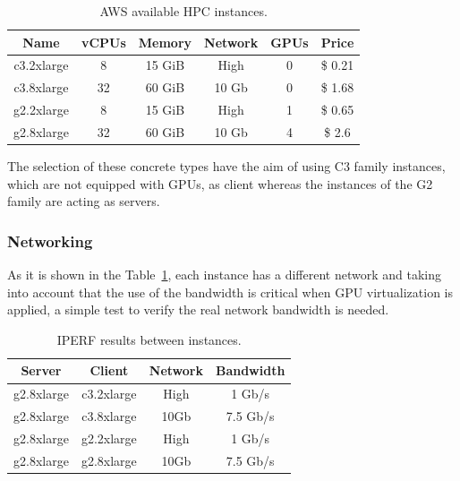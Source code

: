 \documentclass[a4paper,twoside]{article}
\begin{document}
\begin{table}[htb]
\renewcommand{\arraystretch}{1.3}
\caption{AWS available HPC instances.}
\label{table:awsInstances}
\tabcolsep=0.09cm
\begin{center}\begin{tabular}{cccccc}
Name & vCPUs & Memory & Network & GPUs & Price\\ \hline \hline
c3.2xlarge & 8 & 15 GiB & High & 0 & \$ 0.21\\ \hline
c3.8xlarge & 32 & 60 GiB & 10 Gb & 0 & \$ 1.68 \\ \hline
g2.2xlarge & 8 & 15 GiB & High & 1 & \$ 0.65\\ \hline
g2.8xlarge & 32 & 60 GiB & 10 Gb & 4 & \$ 2.6 \\ \hline
\end{tabular}\end{center}\end{table}

The selection of these concrete types have the aim of using C3 family instances, which are not equipped with GPUs, as client whereas the instances of the G2 family are acting as servers.   

\subsubsection{Networking}
As it is shown in the Table~\ref{table:awsInstances}, each instance has a different 
network and taking into account that the use of the bandwidth 
is critical when GPU virtualization is applied, a simple test to verify the 
real network bandwidth is needed.

\begin{table}[htb]
\renewcommand{\arraystretch}{1.3}
\caption{IPERF results between instances.}
\label{table:iperf}
\tabcolsep=0.24cm
\begin{center}\begin{tabular}{cccc}
Server & Client & Network & Bandwidth\\ \hline \hline
g2.8xlarge & c3.2xlarge & High & 1  Gb/s\\ \hline
g2.8xlarge & c3.8xlarge & 10Gb & 7.5  Gb/s\\ \hline
g2.8xlarge & g2.2xlarge & High & 1 Gb/s\\ \hline
g2.8xlarge & g2.8xlarge & 10Gb & 7.5  Gb/s\\ \hline
\end{tabular}\end{center}\end{table}
\end{document}
